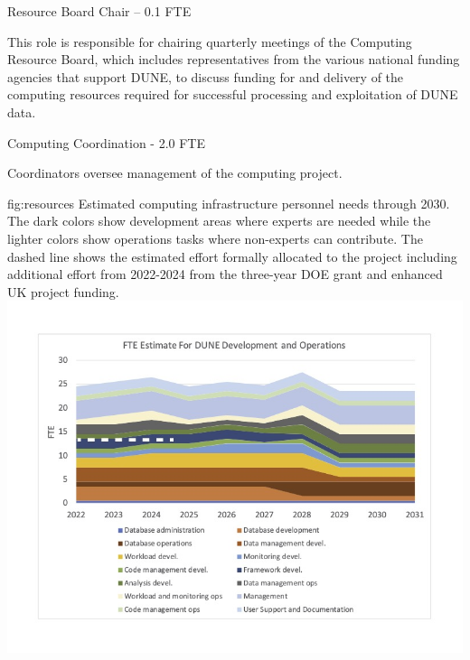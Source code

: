 \documentclass[../main-v1.tex]{subfiles}
\begin{document}
\begin{description}
\item {Resource Board Chair -- 0.1 FTE}

This role is responsible for chairing quarterly meetings of the Computing Resource Board, which includes representatives from the %
various national funding agencies that support DUNE, to discuss %
funding for and delivery of the computing resources required for successful processing and exploitation of DUNE data. %

\item {Computing Coordination - 2.0 FTE}

Coordinators oversee management of the computing project. 
\end{description}



\begin{dunefigure}
{fig:resources}
{Estimated computing infrastructure personnel needs through 2030.  The dark colors show development areas where experts are needed while the lighter colors show operations tasks where non-experts can contribute. The dashed line shows the estimated effort formally allocated to the project including additional effort from 2022-2024 from the three-year DOE grant and enhanced UK project funding.}
{\includegraphics[width=0.9 \textwidth]{graphics/Resources/FTENeeds-2022-03.jpg}}
\end{dunefigure}



\end{document}
